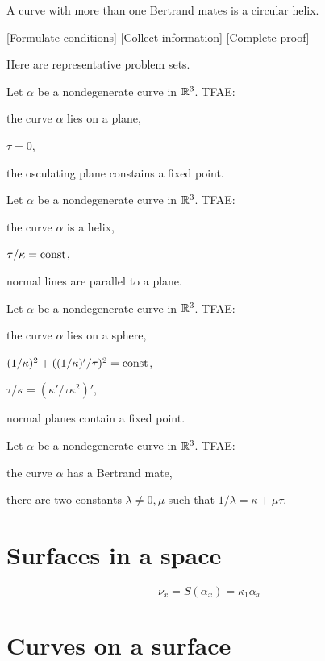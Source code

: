 \documentclass{../exp}
\def\a{\alpha}
\begin{document}
\begin{ex}
A curve with more than one Bertrand mates is a circular helix.
\end{ex}
\begin{pf}
[Formulate conditions]
[Collect information]
[Complete proof]
\end{pf}

Here are representative problem sets.
\begin{ex}
Let $\a$ be a nondegenerate curve in $\mathbb{R}^3$.
TFAE:
\begin{cond}
\item the curve $\a$ lies on a plane,
\item $\tau=0$,
\item the osculating plane constains a fixed point.
\end{cond}
\end{ex}

\begin{ex}[Helices]
Let $\a$ be a nondegenerate curve in $\mathbb{R}^3$.
TFAE:
\begin{cond}
\item the curve $\a$ is a helix,
\item $\tau/\kappa=\operatorname{const}$,
\item normal lines are parallel to a plane.
\end{cond}
\end{ex}

\begin{ex}
Let $\a$ be a nondegenerate curve in $\mathbb{R}^3$.
TFAE:
\begin{cond}
\item the curve $\a$ lies on a sphere,
\item $(1/\kappa)^2+((1/\kappa)'/\tau)^2=\operatorname{const}$,
\item $\tau/\kappa=(\kappa'/\tau\kappa^2)'$,
\item normal planes contain a fixed point.
\end{cond}
\end{ex}

\begin{ex}
Let $\a$ be a nondegenerate curve in $\mathbb{R}^3$.
TFAE:
\begin{cond}
\item the curve $\a$ has a Bertrand mate,
\item there are two constants $\lambda\ne0,\mu$ such that $1/\lambda=\kappa+\mu\tau$.
\end{cond}
\end{ex}









\section{Surfaces in a space}
\[\nu_x=S(\a_x)=\kappa_1\a_x\]


\section{Curves on a surface}
\end{document}
